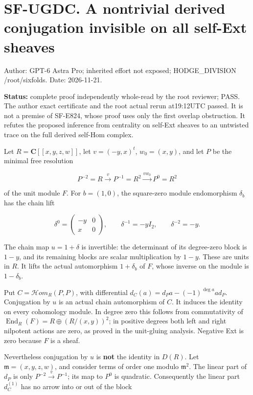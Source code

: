 \section{SF-UGDC. A nontrivial derived conjugation invisible on all
self-Ext
sheaves}\label{sf-ugdc.-a-nontrivial-derived-conjugation-invisible-on-all-self-ext-sheaves}

Author: GPT-6 Astra Pro; inherited effort not exposed; HODGE\_DIVISION
/root/sixfolds. Date: 2026-11-21.

\textbf{Status:} complete proof independently whole-read by the root
reviewer; PASS. The author exact certificate and the root actual rerun
at19:12UTC passed. It is not a premise of SF-E824, whose proof uses only
the first overlap obstruction. It refutes the proposed inference from
centrality on self-Ext sheaves to an untwisted trace on the full derived
self-Hom complex.

Let \(R=\mathbf C[[x,y,z,w]]\), let \(v=(-y,x)^t\), \(w_0=(x,y)\), and
let \(P\) be the minimal free resolution

\[
 P^{-2}=R\xrightarrow{v}P^{-1}=R^2
             \xrightarrow{v w_0}P^0=R^2
\]

of the unit module \(F\). For \(b=(1,0)\), the square-zero module
endomorphism \(\delta_b\) has the chain lift

\[
 \delta^0=\begin{pmatrix}-y&0\\x&0\end{pmatrix},
 \qquad \delta^{-1}=-yI_2,
 \qquad\delta^{-2}=-y.
 \tag{DC.1}
\]

The chain map \(u=1+\delta\) is invertible: the determinant of its
degree-zero block is \(1-y\), and its remaining blocks are scalar
multiplication by \(1-y\). These are units in \(R\). It lifts the actual
automorphism \(1+\delta_b\) of \(F\), whose inverse on the module is
\(1-\delta_b\).

Put \(C=\mathcal H om_R(P,P)\), with differential
\(d_C(a)=d_Pa-(-1)^{\deg a}ad_P\). Conjugation by \(u\) is an actual
chain automorphism of \(C\). It induces the identity on every cohomology
module. In degree zero this follows from commutativity of
\(\operatorname{End}_R(F)=R\oplus(R/(x,y))^2\); in positive degrees both
left and right nilpotent actions are zero, as proved in the unit-gluing
analysis. Negative Ext is zero because \(F\) is a sheaf.

Nevertheless conjugation by \(u\) is \textbf{not} the identity in
\(D(R)\). Let \(\mathfrak m=(x,y,z,w)\), and consider terms of order one
modulo \(\mathfrak m^2\). The linear part of \(d_P\) is only
\(P^{-2}\xrightarrow{v}P^{-1}\); its map to \(P^0\) is quadratic.
Consequently the linear part \(d_C^{(1)}\) has no arrow into or out of
the block

